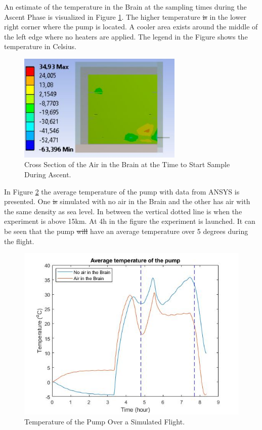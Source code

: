 \documentclass[a4paper,12pt,oneside]{article}
\providecommand{\DIFaddtex}[1]{{\protect\color{blue}\uwave{#1}}} %
\providecommand{\DIFdeltex}[1]{{\protect\color{red}\sout{#1}}}                      %
\providecommand{\DIFaddbegin}{} %
\providecommand{\DIFaddend}{} %
\providecommand{\DIFdelbegin}{} %
\providecommand{\DIFdelend}{} %
\providecommand{\DIFadd}[1]{\texorpdfstring{\DIFaddtex{#1}}{#1}} %
\providecommand{\DIFdel}[1]{\texorpdfstring{\DIFdeltex{#1}}{}} %
\newcommand{\DIFscaledelfig}{0.5}
\newlength{\DIFdelgraphicswidth} %
\newlength{\DIFdelgraphicsheight} %
\newcommand{\DIFaddincludegraphics}[2][]{{\color{blue}\fbox{\DIFOincludegraphics[#1]{#2}}}} %
\newcommand{\DIFdelincludegraphics}[2][]{%
\sbox{\DIFdelgraphicsbox}{\DIFOincludegraphics[#1]{#2}}%
\settoboxwidth{\DIFdelgraphicswidth}{\DIFdelgraphicsbox} %
\settoboxtotalheight{\DIFdelgraphicsheight}{\DIFdelgraphicsbox} %
\scalebox{\DIFscaledelfig}{%
\parbox[b]{\DIFdelgraphicswidth}{\usebox{\DIFdelgraphicsbox}\\[-\baselineskip] \rule{\DIFdelgraphicswidth}{0em}}\llap{\resizebox{\DIFdelgraphicswidth}{\DIFdelgraphicsheight}{%
\setlength{\unitlength}{\DIFdelgraphicswidth}%
\begin{picture}(1,1)%
\thicklines\linethickness{2pt} %
{\color[rgb]{1,0,0}\put(0,0){\framebox(1,1){}}}%
{\color[rgb]{1,0,0}\put(0,0){\line( 1,1){1}}}%
{\color[rgb]{1,0,0}\put(0,1){\line(1,-1){1}}}%
\end{picture}%
}\hspace*{3pt}}} %
} %
\DeclareRobustCommand{\DIFaddbegin}{\DIFOaddbegin \let\includegraphics\DIFaddincludegraphics} %
\DeclareRobustCommand{\DIFaddend}{\DIFOaddend \let\includegraphics\DIFOincludegraphics} %
\DeclareRobustCommand{\DIFdelbegin}{\DIFOdelbegin \let\includegraphics\DIFdelincludegraphics} %
\DeclareRobustCommand{\DIFdelend}{\DIFOaddend \let\includegraphics\DIFOincludegraphics} %
\begin{document}
An estimate of the temperature in the Brain at the sampling times during the Ascent Phase is visualized in Figure \ref{fig:Air-in-brain-4-6}. The higher temperature \DIFdelbegin \DIFdel{is }\DIFdelend \DIFaddbegin \DIFadd{was }\DIFaddend in the lower right corner where the pump is located. A cooler area exists around the middle of the left edge where no heaters are applied. The legend in the Figure shows the temperature in Celsius.

\begin{figure}[H]
    \centering
    \includegraphics[width=0.7\textwidth]{4-experiment-design/img/Thermal/air-sampling-with-box}
    \caption{Cross Section of the Air in the Brain at the Time to Start Sample During Ascent.}
    \label{fig:Air-in-brain-4-6}
\end{figure}

In Figure \ref{fig:test-flight-AAC-4-6} the average temperature of the pump with data from ANSYS is presented. One \DIFdelbegin \DIFdel{is }\DIFdelend \DIFaddbegin \DIFadd{was }\DIFaddend simulated with no air in the Brain and the other has air with the same density as sea level. In between the vertical dotted line is when the experiment is above 15km. At 4h in the figure the experiment is launched. It can be seen that the pump \DIFdelbegin \DIFdel{will }\DIFdelend \DIFaddbegin \DIFadd{should }\DIFaddend have an average temperature over 5 degrees during the flight.
\begin{figure}[H]
    \centering
    \includegraphics[width=\textwidth]{4-experiment-design/img/Thermal/pump-temperature-air-no-air.jpg}
    \caption{Temperature of the Pump Over a Simulated Flight.}
    \label{fig:test-flight-AAC-4-6}
\end{figure}
\end{document}
